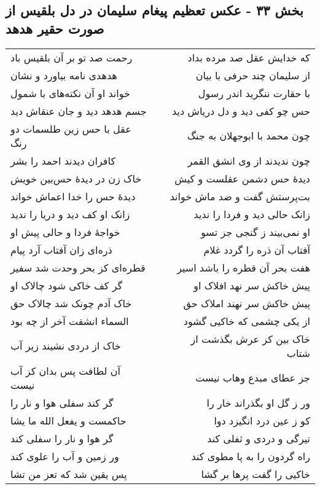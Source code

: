 \begin{center}
\section*{بخش ۳۳ - عکس تعظیم پیغام سلیمان در دل بلقیس از صورت حقیر هدهد}
\label{sec:sh033}
\begin{longtable}{l p{0.5cm} r}
رحمت صد تو بر آن بلقیس باد
&&
که خدایش عقل صد مرده بداد
\\
هدهدی نامه بیاورد و نشان
&&
از سلیمان چند حرفی با بیان
\\
خواند او آن نکته‌های با شمول
&&
با حقارت ننگرید اندر رسول
\\
جسم هدهد دید و جان عنقاش دید
&&
حس چو کفی دید و دل دریاش دید
\\
عقل با حس زین طلسمات دو رنگ
&&
چون محمد با ابوجهلان به جنگ
\\
کافران دیدند احمد را بشر
&&
چون ندیدند از وی انشق القمر
\\
خاک زن در دیدهٔ حس‌بین خویش
&&
دیدهٔ حس دشمن عقلست و کیش
\\
دیدهٔ حس را خدا اعماش خواند
&&
بت‌پرستش گفت و ضد ماش خواند
\\
زانک او کف دید و دریا را ندید
&&
زانک حالی دید و فردا را ندید
\\
خواجهٔ فردا و حالی پیش او
&&
او نمی‌بیند ز گنجی جز تسو
\\
ذره‌ای زان آفتاب آرد پیام
&&
آفتاب آن ذره را گردد غلام
\\
قطره‌ای کز بحر وحدت شد سفیر
&&
هفت بحر آن قطره را باشد اسیر
\\
گر کف خاکی شود چالاک او
&&
پیش خاکش سر نهد افلاک او
\\
خاک آدم چونک شد چالاک حق
&&
پیش خاکش سر نهند املاک حق
\\
السماء انشقت آخر از چه بود
&&
از یکی چشمی که خاکیی گشود
\\
خاک از دردی نشیند زیر آب
&&
خاک بین کز عرش بگذشت از شتاب
\\
آن لطافت پس بدان کز آب نیست
&&
جز عطای مبدع وهاب نیست
\\
گر کند سفلی هوا و نار را
&&
ور ز گل او بگذراند خار را
\\
حاکمست و یفعل الله ما یشا
&&
کو ز عین درد انگیزد دوا
\\
گر هوا و نار را سفلی کند
&&
تیرگی و دردی و ثفلی کند
\\
ور زمین و آب را علوی کند
&&
راه گردون را به پا مطوی کند
\\
پس یقین شد که تعز من تشا
&&
خاکیی را گفت پرها بر گشا
\\

\end{longtable}
\end{center}
